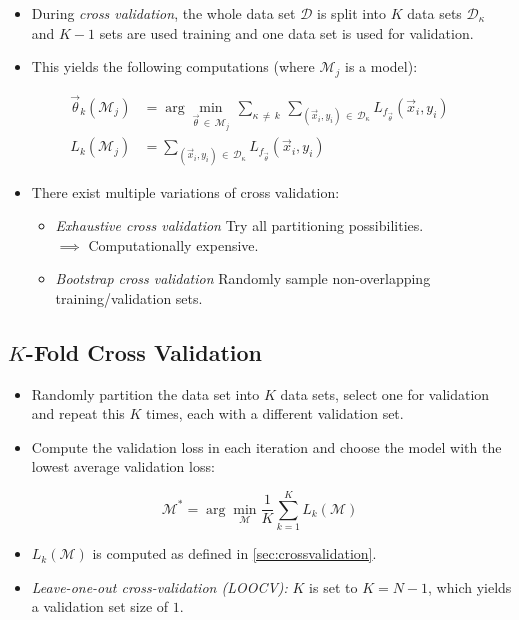			\begin{itemize}
				\item During \emph{cross validation}, the whole data set \(\mathcal{D}\) is split into \(K\) data sets \( \mathcal{D}_\kappa \) and \(K - 1\) sets are used training and one data set is used for validation.
				\item This yields the following computations (where \(\mathcal{M}_j\) is a model):
			\end{itemize}
			\begin{align}
				\vec{\theta}_k (\mathcal{M}_j) &= \arg\min_{\vec{\theta} \,\in\, \mathcal{M}_j} \, \sum_{\kappa \,\neq\, k} \, \sum_{(\vec{x}_i, y_i) \,\in\, \mathcal{D}_\kappa} L_{f_{\vec{\theta}}} (\vec{x}_i, y_i) \\
				L_k(\mathcal{M}_j) &=  \sum_{(\vec{x}_i, y_i) \,\in\, \mathcal{D}_\kappa} L_{f_{\vec{\theta}}} (\vec{x}_i, y_i)
			\end{align}
			\begin{itemize}
				\item There exist multiple variations of cross validation:
					\begin{itemize}
						\item \emph{Exhaustive cross validation} \tabto{5cm} Try all partitioning possibilities. \\
							\tabto{5cm} \qquad \( \implies \) Computationally expensive.
						\item \emph{Bootstrap cross validation} \tabto{5cm} Randomly sample non-overlapping training/validation sets.
					\end{itemize}
			\end{itemize}

		\subsection{\(K\)-Fold Cross Validation}
			\begin{itemize}
				\item Randomly partition the data set into \(K\) data sets, select one for validation and repeat this \(K\) times, each with a different validation set.
				\item Compute the validation loss in each iteration and choose the model with the lowest average validation loss:
			\end{itemize}
			\begin{equation}
				\mathcal{M}^\ast = \arg\min_\mathcal{M} \frac{1}{K} \sum_{k = 1}^{K} L_k(\mathcal{M})
			\end{equation}
			\begin{itemize}
				\item \(L_k(\mathcal{M})\) is computed as defined in \ref{sec:crossvalidation}.
				\item \emph{Leave-one-out cross-validation (LOOCV):} \(K\) is set to \( K = N - 1 \), which yields a validation set size of \(1\).
			\end{itemize}

